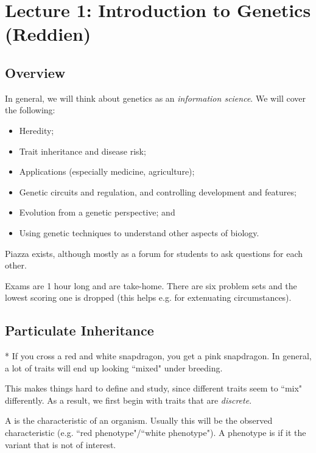 \section*{Lecture 1: Introduction to Genetics (Reddien)}
\setcounter{section}{1}

\subsection{Overview}

In general, we will think about genetics as an \emph{information science}.
We will cover the following:
\begin{itemize}
	\item Heredity;
	\item Trait inheritance and disease risk;
	\item Applications (especially medicine, agriculture);
	\item Genetic circuits and regulation, and controlling development and features;
	\item Evolution from a genetic perspective; and
	\item Using genetic techniques to understand other aspects of biology.
\end{itemize}
Piazza exists, although mostly as a forum for students to ask questions for each other. 

Exams are 1 hour long and are take-home. There are six problem sets and the lowest scoring one is dropped (this helps e.g. for extenuating circumstances). 

\subsection{Particulate Inheritance}

\begin{exper}*
	If you cross a red and white snapdragon, you get a pink snapdragon. In general, a lot of traits will end up looking ``mixed" under breeding. 
\end{exper}

This makes things hard to define and study, since different traits seem to ``mix" differently. As a result, we first begin with traits that are \emph{discrete}. 

\begin{defn}
	A  is the characteristic of an organism. Usually this will be the observed characteristic (e.g. ``red phenotype"/``white phenotype"). A phenotype is  if it the variant that is not of interest.
\end{defn}

